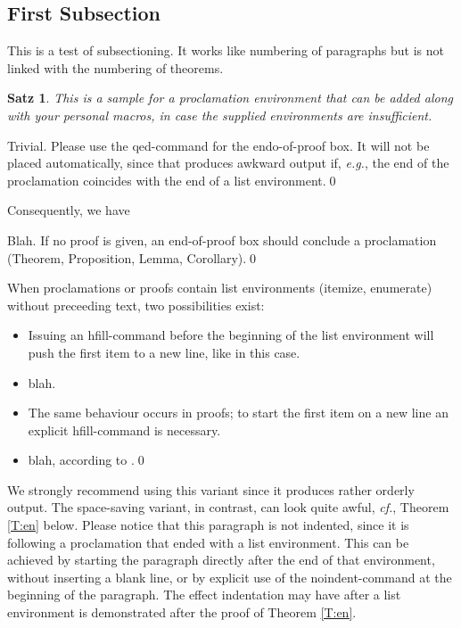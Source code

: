 \documentclass{lmcs}
\theoremstyle{plain}\newtheorem{satz}[thm]{Satz}
\def\eg{{\em e.g.}}
\def\cf{{\em cf.}}
\begin{document}
\subsection{First Subsection}

  This is a test of subsectioning.  It works like numbering of
  paragraphs but is not linked with the numbering of theorems.

\begin{satz}\label{T:big}
  This is a sample for a proclamation environment that can be added
  along with your personal macros, in case the supplied environments
  are insufficient.
\end{satz}

\proof
  Trivial.  Please use the qed-command for the endo-of-proof box.  It
  will not be placed automatically, since that produces awkward output
  if, \eg, the end of the proclamation coincides with the end of a
  list environment.\qed

  Consequently, we have

\begin{cor}\label{C:big}
  Blah.  If no proof is given, an end-of-proof box should conclude a
  proclamation (Theorem, Proposition, Lemma, Corollary).\qed
\end{cor}

  When proclamations or proofs contain list environments (itemize,
  enumerate) without preceeding text, two possibilities exist:

\begin{thm}\label{T:m}\hfill  %
\begin{itemize}
\item[(0)]
  Issuing an hfill-command before the beginning of the list
  environment will push the first item to a new line, like in this case.
\item[(1)]
  blah.
\end{itemize}
\end{thm}

\proof\hfill  %
\begin{itemize}
\item[(0)]
  The same behaviour occurs in proofs; to start the first item on a
  new line an explicit hfill-command is necessary.
\item[(1)]
  blah, according to \cite{koslowski:mib}.\qed
\end{itemize}

  \noindent We strongly recommend using this variant since it produces
  rather orderly output.  The space-saving variant, in contrast, can
  look quite awful, \cf, Theorem \ref{T:en} below.  Please notice that
  this paragraph is not indented, since it is following a proclamation
  that ended with a list environment.  This can be achieved by
  starting the paragraph directly after the end of that environment,
  without inserting a blank line, or by explicit use of the
  noindent-command at the beginning of the paragraph.  The effect
  indentation may have after a list environment is demonstrated after
  the proof of Theorem \ref{T:en}.
\end{document}
